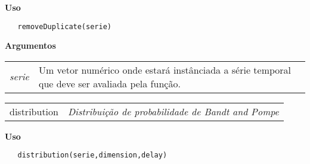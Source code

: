 \vspace{-0.5cm}

\hrulefill  

\vspace{0.5cm}

\textbf{Uso}

\begin{lstlisting}
   removeDuplicate(serie)
\end{lstlisting}

\vspace{0.5cm}

\textbf{Argumentos}

\begin{table}[!ht]
\begin{center}
\begin{tabularx}{\textwidth}{X X}
\hspace{0.5cm} \textit{serie} & Um vetor numérico onde estará instânciada a série temporal que deve ser avaliada pela função.\\
\end{tabularx}
\end{center}
\end{table} 


\hrulefill   

\begin{table}[!ht]
\begin{center}
\begin{tabularx}{\textwidth}{X X}
\hspace{0.5cm} distribution & \textit{Distribuição de probabilidade de Bandt and Pompe}\\
\end{tabularx}
\end{center}
\end{table} 

\vspace{-0.5cm}

\hrulefill  

\vspace{0.5cm}

\textbf{Uso}

\begin{lstlisting}
   distribution(serie,dimension,delay)
\end{lstlisting}

\vspace{0.5cm}

